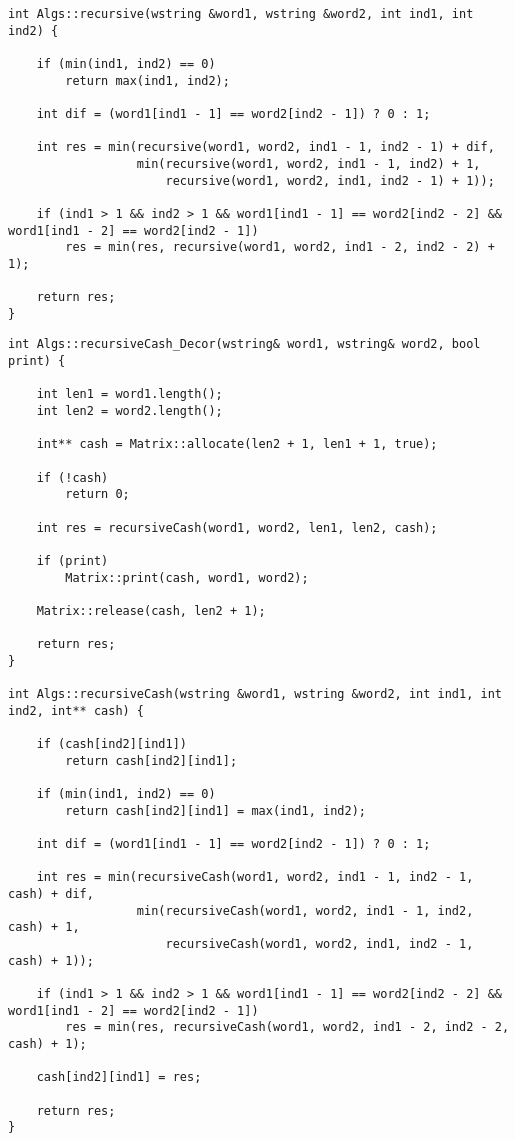 \clearpage

\begin{lstlisting}[label=lst:dameray_lev_mtr,caption=Функция нахождения расстояния Дамерау\,--\,Левенштейна рекурсивно]
int Algs::recursive(wstring &word1, wstring &word2, int ind1, int ind2) {

    if (min(ind1, ind2) == 0)
        return max(ind1, ind2);

    int dif = (word1[ind1 - 1] == word2[ind2 - 1]) ? 0 : 1;

    int res = min(recursive(word1, word2, ind1 - 1, ind2 - 1) + dif,
                  min(recursive(word1, word2, ind1 - 1, ind2) + 1, 
                      recursive(word1, word2, ind1, ind2 - 1) + 1));

    if (ind1 > 1 && ind2 > 1 && word1[ind1 - 1] == word2[ind2 - 2] && word1[ind1 - 2] == word2[ind2 - 1])
        res = min(res, recursive(word1, word2, ind1 - 2, ind2 - 2) + 1);

    return res;
}
\end{lstlisting}

\clearpage

\begin{lstlisting}[label=lst:dameray_lev_rec_hash,caption=Функция нахождения расстояния Дамерау\,--\,Левенштейна рекурсивно c кешированием]
int Algs::recursiveCash_Decor(wstring& word1, wstring& word2, bool print) {

    int len1 = word1.length();
    int len2 = word2.length();

    int** cash = Matrix::allocate(len2 + 1, len1 + 1, true);

    if (!cash)
        return 0;

    int res = recursiveCash(word1, word2, len1, len2, cash);

    if (print)  
        Matrix::print(cash, word1, word2);

    Matrix::release(cash, len2 + 1);

    return res;
}

int Algs::recursiveCash(wstring &word1, wstring &word2, int ind1, int ind2, int** cash) {

    if (cash[ind2][ind1])
        return cash[ind2][ind1];

    if (min(ind1, ind2) == 0)
        return cash[ind2][ind1] = max(ind1, ind2);

    int dif = (word1[ind1 - 1] == word2[ind2 - 1]) ? 0 : 1;

    int res = min(recursiveCash(word1, word2, ind1 - 1, ind2 - 1, cash) + dif,
                  min(recursiveCash(word1, word2, ind1 - 1, ind2, cash) + 1, 
                      recursiveCash(word1, word2, ind1, ind2 - 1, cash) + 1));

    if (ind1 > 1 && ind2 > 1 && word1[ind1 - 1] == word2[ind2 - 2] && word1[ind1 - 2] == word2[ind2 - 1])
        res = min(res, recursiveCash(word1, word2, ind1 - 2, ind2 - 2, cash) + 1);

    cash[ind2][ind1] = res;

    return res;
}
\end{lstlisting}

